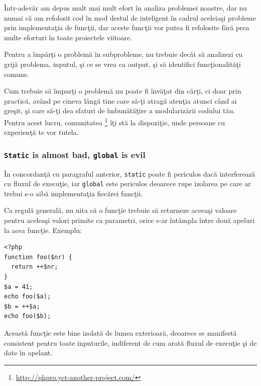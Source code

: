 Într-adevăr am depus mult mai mult efort în analiza problemei noastre, dar
nu numai că am refolosit cod în mod destul de inteligent în
cadrul aceleiaşi probleme prin implementaţia
de funcţii, dar aceste funcţii vor putea fi refolosite fără prea multe
eforturi în toate proiectele viitoare.

Pentru a împărţi o problemă în subprobleme, nu trebuie decât să analizezi
cu grijă problema, inputul, şi ce se vrea ca output, şi să identifici
funcţionalităţi comune.

Cum trebuie să împarţi o problemă nu poate fi învăţat din cărţi, ci doar
prin practică, având pe cineva lângă tine care să-ţi atragă atenţia
atunci când ai greşit, şi care să-ţi dea sfaturi de îmbunătăţire
a modularizării codului tău. Pentru acest lucru, comunitatea
{\phpro}\footnote{\url{http://phpro.yet-another-project.com/}}
îţi stă la dispoziţie, unde persoane cu experienţă te vor tutela.


\subsubsection{\texttt{Static} is almost bad, \texttt{global} is evil}
În concordanţă cu paragraful anterior, \texttt{static} poate fi periculos
dacă interferează cu fluxul de execuţie, iar \texttt{global} este
periculos deoarece rupe izolarea pe care ar trebui s-o aibă implementaţia
fiecărei funcţii.

Ca regulă generală, nu uita că o funcţie trebuie să returneze aceeaşi valoare
pentru aceleaşi valori primite ca parametri, orice s-ar întâmpla între două
apeluri la acea funcţie. Exemplu:
\begin{lstlisting}
<?php
function foo($nr) {
  return ++$nr;
}
$a = 41;
echo foo($a);
$b = ++$a;
echo foo($b);
\end{lstlisting}
Această funcţie este bine izolată de lumea exterioară, deoarece se manifestă
consistent pentru toate inputurile, indiferent de cum arată fluxul de execuţie
şi de date în apelant.

